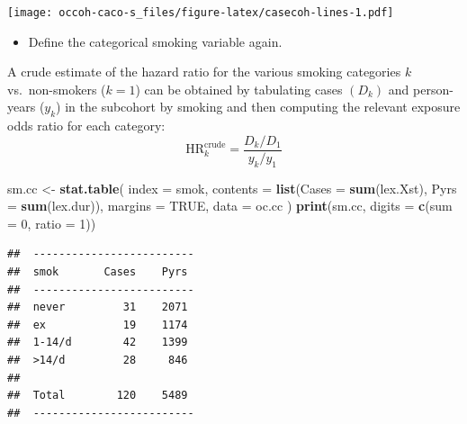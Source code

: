 \documentclass[
]{book}
\newenvironment{Shaded}{\begin{snugshade}}{\end{snugshade}}
\newcommand{\AttributeTok}[1]{\textcolor[rgb]{0.13,0.29,0.53}{#1}}
\newcommand{\ConstantTok}[1]{\textcolor[rgb]{0.56,0.35,0.01}{#1}}
\newcommand{\DecValTok}[1]{\textcolor[rgb]{0.00,0.00,0.81}{#1}}
\newcommand{\FunctionTok}[1]{\textcolor[rgb]{0.13,0.29,0.53}{\textbf{#1}}}
\newcommand{\NormalTok}[1]{#1}
\newcommand{\OtherTok}[1]{\textcolor[rgb]{0.56,0.35,0.01}{#1}}
\newcommand{\SpecialCharTok}[1]{\textcolor[rgb]{0.81,0.36,0.00}{\textbf{#1}}}
\newcommand{\StringTok}[1]{\textcolor[rgb]{0.31,0.60,0.02}{#1}}
\providecommand{\tightlist}{%
  \setlength{\itemsep}{0pt}\setlength{\parskip}{0pt}}
\begin{document}
\texttt{[image: occoh-caco-s\_files/figure-latex/casecoh-lines-1.pdf]}

\begin{itemize}
\tightlist
\item
  Define the categorical smoking variable again.
\end{itemize}

\begin{Shaded}
\end{Shaded}

A crude estimate of the hazard ratio for the various smoking categories \(k\)
vs.~non-smokers (\(k=1\)) can be obtained by tabulating cases \((D_k)\) and person-years (\(y_k\))
in the subcohort by smoking and then computing the
relevant exposure odds ratio for each category:
\[ \text{HR}_k ^{\text{crude}} = \frac{D_k/D_1}{y_k/y_1} \]

\begin{Shaded}
\begin{Highlighting}[]
\NormalTok{sm.cc }\OtherTok{\textless{}{-}} \FunctionTok{stat.table}\NormalTok{(}
  \AttributeTok{index =}\NormalTok{ smok,}
  \AttributeTok{contents =} \FunctionTok{list}\NormalTok{(}\AttributeTok{Cases =} \FunctionTok{sum}\NormalTok{(lex.Xst), }\AttributeTok{Pyrs =} \FunctionTok{sum}\NormalTok{(lex.dur)),}
  \AttributeTok{margins =} \ConstantTok{TRUE}\NormalTok{, }
  \AttributeTok{data =}\NormalTok{ oc.cc}
\NormalTok{)}
\FunctionTok{print}\NormalTok{(sm.cc, }\AttributeTok{digits =} \FunctionTok{c}\NormalTok{(}\AttributeTok{sum =} \DecValTok{0}\NormalTok{, }\AttributeTok{ratio =} \DecValTok{1}\NormalTok{))}
\end{Highlighting}
\end{Shaded}

\begin{verbatim}
##  ------------------------- 
##  smok       Cases    Pyrs  
##  ------------------------- 
##  never         31    2071  
##  ex            19    1174  
##  1-14/d        42    1399  
##  >14/d         28     846  
##                            
##  Total        120    5489  
##  -------------------------
\end{verbatim}
\end{document}
